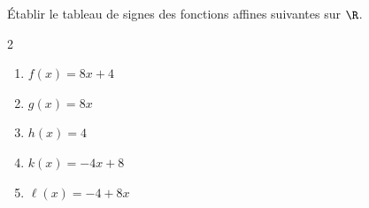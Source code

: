 \begin{exo}{}
	Établir le tableau de signes des fonctions affines suivantes sur $\R$.
	\vspace*{-2mm}
	\begin{multicols}{2}
	\begin{enumerate}
		\item $f(x) = 8x + 4$
		\item $g(x) = 8x$
		\item $h(x) = 4$
		\item $k(x) = -4x + 8$
		\item $\ell(x) = -4 + 8x$
	\end{enumerate}
	\end{multicols}
\end{exo}
